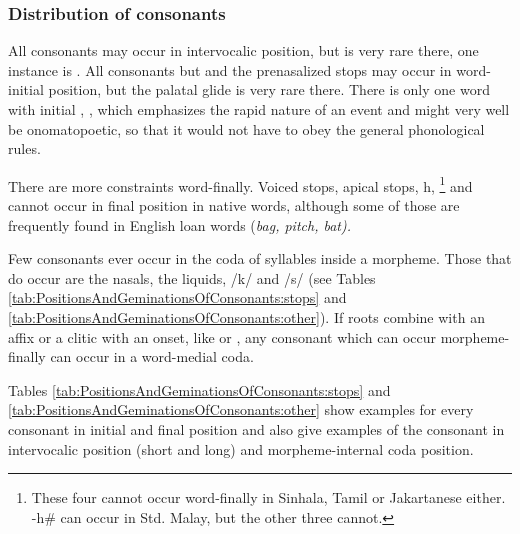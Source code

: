 \subsubsection{Distribution of consonants}\label{sec:phon:Distributionofconsonants}
All consonants may occur in intervocalic position, but \dentd{} is very rare there, one instance is .
All consonants but \ng{} and the prenasalized stops may occur in  word-initial position, but the palatal glide is very rare there. There is only one word with initial \tz{}, , which emphasizes the rapid nature of an event and might very well be onomatopoetic, so that it would not have to obey the general phonological rules.

There are more constraints word-finally. Voiced stops, apical stops,  h, \ny{}\footnote{These four cannot occur word-finally in Sinhala, Tamil or Jakartanese either. -h\# can occur in Std. Malay, but the other three cannot.} and \V{}  cannot occur in final position in native words, although some of those are frequently found in English loan words (\em bag, pitch, bat\em).

Few consonants ever occur in the coda of syllables inside a morpheme. Those that do occur are the nasals, the liquids, /k/ and /s/ (see Tables \ref{tab:PositionsAndGeminationsOfConsonants:stops} and \ref{tab:PositionsAndGeminationsOfConsonants:other}). If roots combine with an affix or a clitic with an onset, like  or , any consonant which can occur morpheme-finally can occur in a word-medial coda.

Tables \ref{tab:PositionsAndGeminationsOfConsonants:stops} and \ref{tab:PositionsAndGeminationsOfConsonants:other} show examples for every consonant in initial and final position and also give  examples of the consonant in intervocalic position (short and long) and morpheme-internal coda position.


